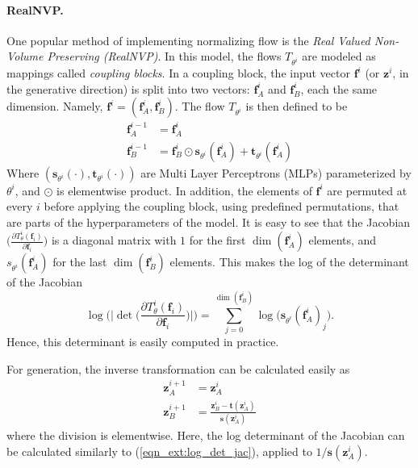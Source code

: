 \documentclass{article}
\theoremstyle{plain}
\theoremstyle{definition}
\theoremstyle{remark}
\begin{document}
\paragraph{RealNVP.}
One popular method of implementing normalizing flow is the \emph{Real Valued Non-Volume Preserving (RealNVP)}. In this model, the flows $T_{\theta^i}$ are modeled as mappings called \emph{coupling blocks}. In a coupling block, the input  vector $\mathbf{f}^i$ (or $\mathbf{z}^i$, in the generative direction) is split into two vectors: $\mathbf{f}^i_A$ and $\mathbf{f}^i_B$, each the same dimension. Namely, $\mathbf{f}^i=(\mathbf{f}^i_A,\mathbf{f}^i_B)$.
The flow $T_{\theta^i}$ is then defined to be
\begin{align}
    \mathbf{f}_A^{i-1}& = \mathbf{f}_A^i \\
    \mathbf{f}_B^{i-1} &= \mathbf{f}_B^i \odot \mathbf{s}_{\theta^i}(\mathbf{f}_A^i) + \mathbf{t}_{\theta^i}(\mathbf{f}_A^i) 
\end{align}
Where $(\mathbf{s}_{\theta^i}(\cdot), \mathbf{t}_{\theta^i}(\cdot))$ are Multi Layer Perceptrons (MLPs) parameterized by $\theta^i$, and $\odot$ is elementwise product. 
In addition, the elements of $\mathbf{f}^i$ are permuted at every $i$ before applying the coupling block, using predefined permutations, that are parts of the hyperparameters of the model.
It is easy to see that the Jacobian $\bigg( \frac{\partial T_\theta^i (\mathbf{f}_i)}{\partial  \mathbf{f}_i}  \bigg)$ is a diagonal matrix with $1$ for the first $\dim(\mathbf{f}_A^i)$ elements, and $s_{\theta^i}(\mathbf{f}_A^i)$ for the last $\dim(\mathbf{f}_B^i)$ elements. This  makes the log of the determinant of the Jacobian
\begin{equation}
\log\Bigg(\bigg| \det \bigg( \frac{\partial T_\theta^i (\mathbf{f}_i)}{\partial  \mathbf{f}_i}  \bigg) \bigg|\Bigg) = \sum_{j=0}^{\dim(\mathbf{f}_B^i)}\log \Big( \mathbf{s}_{\theta^i}(\mathbf{f}_A^i)_j \Big). 
 \label{eqn_ext:log_det_jac}   
\end{equation}
Hence, this determinant is easily computed in practice.

For generation, the inverse transformation can be calculated easily as
\begin{align*}
\mathbf{z}_A^{i+1} &= \mathbf{z}_A^{i} \\
\mathbf{z}_B^{i+1} &= \frac{\mathbf{z}_B^{i} - \mathbf{t}(\mathbf{z}_A^i)}{\mathbf{s}(\mathbf{z}_A^i)}
\end{align*}
where the division is elementwise.
Here, the log determinant of the Jacobian can be calculated similarly to (\ref{eqn_ext:log_det_jac}),  applied to $1/\mathbf{s}(\mathbf{z}_A^i)$.
\end{document}
